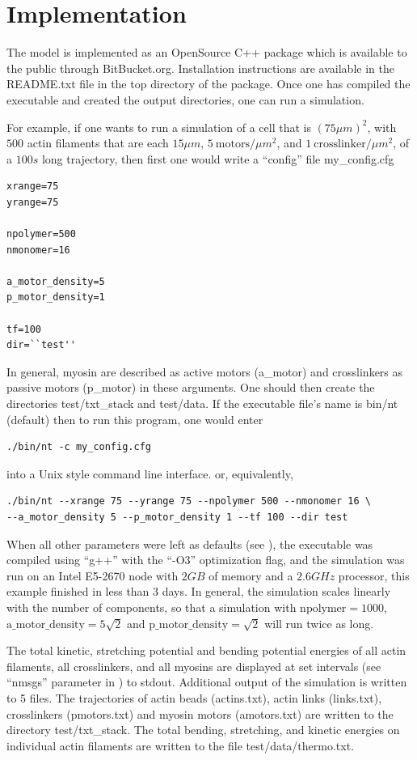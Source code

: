 \documentclass[12pt]{article}
\begin{document}
\section{Implementation}
The model is implemented as an OpenSource C++ package which is available to the public
through BitBucket.org. Installation instructions are available in the README.txt 
file in the top directory of the package. Once one has compiled the executable and created
the output directories, one can run a simulation. 
\par
For example, if one wants to run a simulation of a cell that is $(75\mu m)^2$, with $500$ actin 
filaments that are each $15\mu m$, $5\ \textrm{motors}/\mu m^2$, and $1\ \textrm{crosslinker}/\mu m^2$,
of a $100s$ long trajectory, then first one would write a ``config'' file 
my\_config.cfg
\begin{verbatim}
xrange=75
yrange=75

npolymer=500
nmonomer=16

a_motor_density=5
p_motor_density=1

tf=100
dir=``test''
\end{verbatim}
In general, myosin are described as active motors (a\_motor) and crosslinkers as
passive motors (p\_motor) in these arguments. One should then create the directories 
test/txt\_stack and test/data. 
If the executable file's name is bin/nt (default) then to run this program, one would enter
\begin{verbatim}
./bin/nt -c my_config.cfg
\end{verbatim}
into a Unix style command line interface. 
or, equivalently,
\begin{verbatim}
./bin/nt --xrange 75 --yrange 75 --npolymer 500 --nmonomer 16 \
--a_motor_density 5 --p_motor_density 1 --tf 100 --dir test
\end{verbatim}
When all other parameters were left as defaults (see ),
the executable was compiled using ``g++'' with the ``-O3'' optimization flag,
and the simulation was run on an Intel E5-2670 node with $2GB$ of memory and a $2.6GHz$ 
processor, this example finished in less than 3 days. In general, the simulation 
scales linearly with the number of components, so that a simulation with 
$\textrm{npolymer} = 1000$, $\textrm{a\_motor\_density}=5\sqrt{2}$ and $\textrm{p\_motor\_density}=\sqrt{2}$ 
will run twice as long. 
\par
The total kinetic, stretching potential and bending potential energies of all actin 
filaments, all crosslinkers, and all myosins are displayed at set intervals
(see ``nmsgs'' parameter in \Cref{tab:options}) to stdout.
Additional output of the simulation is written to 5 files. The trajectories of 
actin beads (actins.txt), actin links (links.txt), crosslinkers (pmotors.txt) 
and myosin motors (amotors.txt) are written to the directory test/txt\_stack.
The total bending, stretching, and kinetic energies on individual actin filaments
are written to the file test/data/thermo.txt. 
\end{document}
